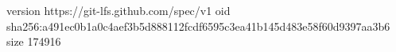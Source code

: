 version https://git-lfs.github.com/spec/v1
oid sha256:a491ec0b1a0c4aef3b5d888112fcdf6595c3ea41b145d483e58f60d9397aa3b6
size 174916
